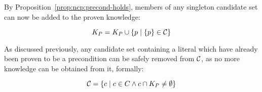 \documentclass[\master/Master.tex]{subfiles}
\begin{document}
By Proposition~\ref{prop:ncp:precond-holds}, members of any singleton candidate set can now be added to the proven knowledge:

\begin{equation} \label{eq:extractKnown}
    K_P = K_P \cup \left\{ p \; | \; \{ p \} \in \mathcal{C} \right\}
\end{equation}

As discussed previously, any candidate set containing a literal which have already been proven to be a precondition can be safely removed from $\mathcal{C}$, as no more knowledge can be obtained from it, formally:


\begin{equation} \label{eq:removeKnown}
    \mathcal{C} = \left\{ c \; | \; c \in C \land c \cap K_P \neq \emptyset \right\}
\end{equation}
\end{document}
